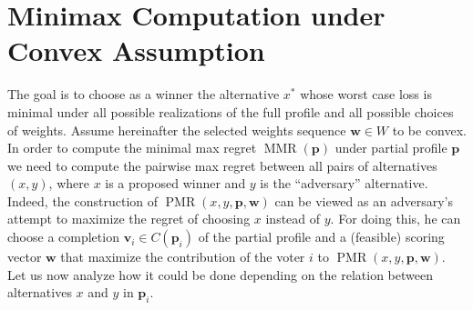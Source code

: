 \documentclass[12pt]{article}
\newcommand{\profile}{\textbf{v}}%
\newcommand{\pprofile}{\textbf{p}}%
\newcommand{\w}{\textbf{w}}%
\DeclareMathOperator{\PMR}{PMR}
\DeclareMathOperator{\MMR}{MMR}
\begin{document}
\section{Minimax Computation under Convex Assumption \cite{Lu2011}}
The goal is to choose as a winner the alternative $x^*$ whose worst case loss is minimal under all possible realizations of the full profile and all possible choices of weights. Assume hereinafter the selected weights sequence $\w \in W$ to be convex. In order to compute the minimal max regret $\MMR(\pprofile)$ under partial profile $\pprofile$ we need to compute the pairwise max regret between all pairs of alternatives $(x,y)$, where $x$ is a proposed winner and $y$ is the ``adversary'' alternative. Indeed, the construction of $\PMR(x,y,\pprofile,\w)$ can be viewed as an adversary's attempt to maximize the regret of choosing $x$ instead of $y$. For doing this, he can choose a completion $\profile_i \in C(\pprofile_i)$ of the partial profile and a (feasible) scoring vector $\w$ that maximize the contribution of the voter $i$ to $\PMR(x,y,\pprofile,\w)$. Let us now analyze how it could be done depending on the relation between alternatives $x$ and $y$ in $\pprofile_i$. 
\end{document}
